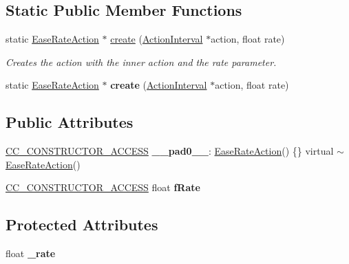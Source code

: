 \subsection*{Static Public Member Functions}
\begin{DoxyCompactItemize}
\item 
static \hyperlink{classEaseRateAction}{Ease\+Rate\+Action} $\ast$ \hyperlink{classEaseRateAction_a94d1d8c5c219f82bbb15e31eea82ef99}{create} (\hyperlink{classActionInterval}{Action\+Interval} $\ast$action, float rate)
\begin{DoxyCompactList}\small\item\em Creates the action with the inner action and the rate parameter. \end{DoxyCompactList}\item 
\mbox{\label{classEaseRateAction_a3bdce12633853d6ee92362f4190d2060}} 
static \hyperlink{classEaseRateAction}{Ease\+Rate\+Action} $\ast$ {\bfseries create} (\hyperlink{classActionInterval}{Action\+Interval} $\ast$action, float rate)
\end{DoxyCompactItemize}
\subsection*{Public Attributes}
\begin{DoxyCompactItemize}
\item 
\mbox{\label{classEaseRateAction_a129666fbb3fdcd25a9247cf6098508d8}} 
\hyperlink{_2cocos2d_2cocos_2base_2ccConfig_8h_a25ef1314f97c35a2ed3d029b0ead6da0}{C\+C\+\_\+\+C\+O\+N\+S\+T\+R\+U\+C\+T\+O\+R\+\_\+\+A\+C\+C\+E\+SS} {\bfseries \+\_\+\+\_\+pad0\+\_\+\+\_\+}\+: \hyperlink{classEaseRateAction}{Ease\+Rate\+Action}() \{\} virtual $\sim$\hyperlink{classEaseRateAction}{Ease\+Rate\+Action}()
\item 
\mbox{\label{classEaseRateAction_aa16233ff01c4f88ad03fc1f36df1e9ca}} 
\hyperlink{_2cocos2d_2cocos_2base_2ccConfig_8h_a25ef1314f97c35a2ed3d029b0ead6da0}{C\+C\+\_\+\+C\+O\+N\+S\+T\+R\+U\+C\+T\+O\+R\+\_\+\+A\+C\+C\+E\+SS} float {\bfseries f\+Rate}
\end{DoxyCompactItemize}
\subsection*{Protected Attributes}
\begin{DoxyCompactItemize}
\item 
\mbox{\label{classEaseRateAction_ab5e027d6085c11ad41cedb94a414d46c}} 
float {\bfseries \+\_\+rate}
\end{DoxyCompactItemize}

